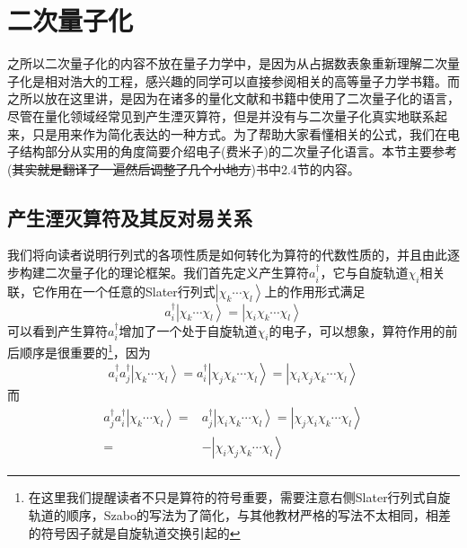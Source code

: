 \documentclass[12pt,a4paper,openany,twoside]{book}
\numberwithin{equation}{section}
\begin{document}
      \section{二次量子化}
        之所以二次量子化的内容不放在量子力学中，是因为从占据数表象重新理解二次量子化是相对浩大的工程，感兴趣的同学可以直接参阅相关的高等量子力学书籍。而之所以放在这里讲，是因为在诸多的量化文献和书籍中使用了二次量子化的语言，尽管在量化领域经常见到产生湮灭算符，但是并没有与二次量子化真实地联系起来，只是用来作为简化表达的一种方式。为了帮助大家看懂相关的公式，我们在电子结构部分从实用的角度简要介绍电子(费米子)的二次量子化语言。本节主要参考(\sout{其实就是翻译了一遍然后调整了几个小地方})\cite{Szabo1989Modern}书中2.4节的内容。

        \subsection{产生湮灭算符及其反对易关系} 
          我们将向读者说明行列式的各项性质是如何转化为算符的代数性质的，并且由此逐步构建二次量子化的理论框架。我们首先定义产生算符$a_i^{\dagger}$，它与自旋轨道$\chi_i$相关联，它作用在一个任意的Slater行列式$\left|\chi_k\cdots\chi_l\right\rangle$上的作用形式满足
          \begin{equation}
            a_i^{\dagger}\left|\chi_k\cdots\chi_l\right\rangle=\left|\chi_i\chi_k\cdots\chi_l\right\rangle
            \label{creation operator}
          \end{equation}
          可以看到产生算符$a_i^{\dagger}$增加了一个处于自旋轨道$\chi_i$的电子，可以想象，算符作用的前后顺序是很重要的\footnote{在这里我们提醒读者不只是算符的符号重要，需要注意右侧Slater行列式自旋轨道的顺序，Szabo的写法为了简化，与其他教材严格的写法不太相同，相差的符号因子就是自旋轨道交换引起的}，因为
          \begin{equation}
            a_i^{\dagger}a_j^{\dagger}\left|\chi_k\cdots\chi_l\right\rangle=a_i^{\dagger}
            \left|\chi_j\chi_k\cdots\chi_l\right\rangle=\left|\chi_i\chi_j\chi_k\cdots\chi_l\right\rangle
          \end{equation}
          而
          \begin{equation}
            \begin{aligned}
              a_j^{\dagger}a_i^{\dagger}\left|\chi_k\cdots\chi_l\right\rangle=&a_j^{\dagger}\left|\chi_i\chi_k\cdots\chi_l\right\rangle=\left|\chi_j\chi_i\chi_k\cdots\chi_l\right\rangle\\
              =&-\left|\chi_i\chi_j\chi_k\cdots\chi_l\right\rangle
            \end{aligned}
          \end{equation}
\end{document}
